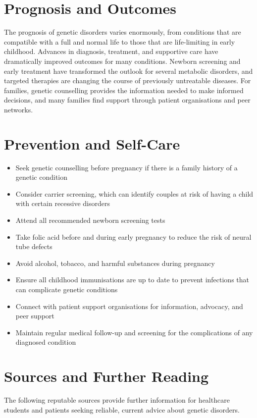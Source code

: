 \section*{Prognosis and Outcomes}
The prognosis of genetic disorders varies enormously, from conditions that are compatible with a full and normal life to those that are life-limiting in early childhood. Advances in diagnosis, treatment, and supportive care have dramatically improved outcomes for many conditions. Newborn screening and early treatment have transformed the outlook for several metabolic disorders, and targeted therapies are changing the course of previously untreatable diseases. For families, genetic counselling provides the information needed to make informed decisions, and many families find support through patient organisations and peer networks.

\section*{Prevention and Self-Care}
\begin{itemize}
    \item Seek genetic counselling before pregnancy if there is a family history of a genetic condition
    \item Consider carrier screening, which can identify couples at risk of having a child with certain recessive disorders
    \item Attend all recommended newborn screening tests
    \item Take folic acid before and during early pregnancy to reduce the risk of neural tube defects
    \item Avoid alcohol, tobacco, and harmful substances during pregnancy
    \item Ensure all childhood immunisations are up to date to prevent infections that can complicate genetic conditions
    \item Connect with patient support organisations for information, advocacy, and peer support
    \item Maintain regular medical follow-up and screening for the complications of any diagnosed condition
\end{itemize}

\section*{Sources and Further Reading}
The following reputable sources provide further information for healthcare students and patients seeking reliable, current advice about genetic disorders.

